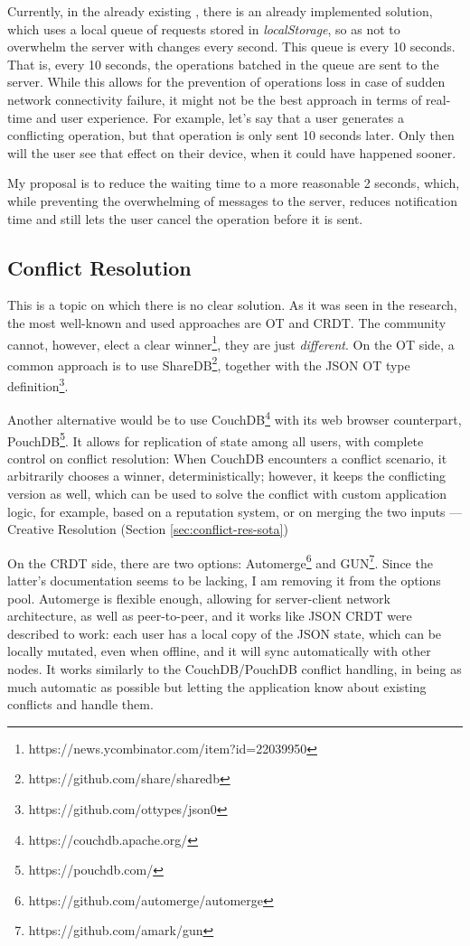 Currently, in the already existing , there is an already implemented solution, which uses a local queue of requests stored in \textit{localStorage}, so as not to overwhelm the server with changes every second. This queue is  every 10 seconds. That is, every 10 seconds, the operations batched in the queue are sent to the server. While this allows for the prevention of operations loss in case of sudden network connectivity failure, it might not be the best approach in terms of real-time and user experience. For example, let's say that a user generates a conflicting operation, but that operation is only sent 10 seconds later. Only then will the user see that effect on their device, when it could have happened sooner.

My proposal is to reduce the waiting time to a more reasonable 2 seconds, which, while preventing the overwhelming of messages to the server, reduces notification time and still lets the user cancel the operation before it is sent.

\subsection{Conflict Resolution} \label{sec:prob-solution-conflict-res}
This is a topic on which there is no clear solution. As it was seen in the research, the most well-known and used approaches are OT and CRDT. The community cannot, however, elect a clear winner\footnote{https://news.ycombinator.com/item?id=22039950}, they are just \textit{different}. On the OT side, a common approach is to use ShareDB\footnote{https://github.com/share/sharedb}, together with the JSON OT type definition\footnote{https://github.com/ottypes/json0}.

Another alternative would be to use CouchDB\footnote{https://couchdb.apache.org/} with its web browser counterpart, PouchDB\footnote{https://pouchdb.com/}. It allows for replication of state among all users, with complete control on conflict resolution: When CouchDB encounters a conflict scenario, it arbitrarily chooses a winner, deterministically; however, it keeps the conflicting version as well, which can be used to solve the conflict with custom application logic, for example, based on a reputation system, or on merging the two inputs --- Creative Resolution (Section \ref{sec:conflict-res-sota})

On the CRDT side, there are two options: Automerge\footnote{https://github.com/automerge/automerge} and GUN\footnote{https://github.com/amark/gun}. Since the latter's documentation seems to be lacking, I am removing it from the options pool. Automerge is flexible enough, allowing for server-client network architecture, as well as peer-to-peer, and it works like JSON CRDT were described to work: each user has a local copy of the JSON state, which can be locally mutated, even when offline, and it will sync automatically with other nodes. It works similarly to the CouchDB/PouchDB conflict handling, in being as much automatic as possible but letting the application know about existing conflicts and handle them.

